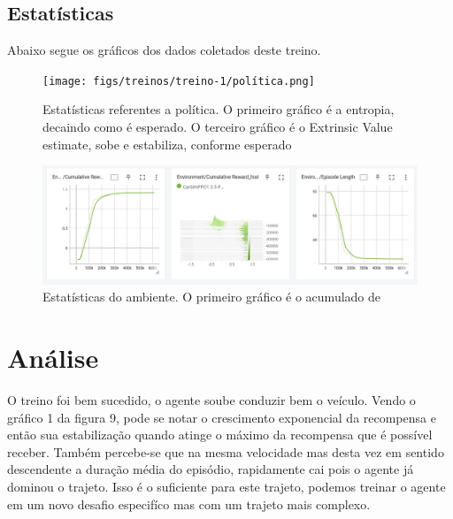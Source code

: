 \subsection*{Estatísticas}

Abaixo segue os gráficos dos dados coletados deste treino. 

\begin{figure}[h]
    \centering
    \texttt{[image: figs/treinos/treino-1/política.png]}
     \caption{Estatísticas referentes a política. O primeiro gráfico é a entropia, decaindo como é esperado. O terceiro gráfico é o Extrinsic Value estimate, sobe e estabiliza, conforme esperado}
     \label{fig:treino-1-politica}
\end{figure}

\begin{figure}[h]
    \centering
    \includegraphics[scale=0.35]{figs/treinos/treino-1/ambiente.png}
     \caption{Estatísticas do ambiente. O primeiro gráfico é o acumulado de }
     \label{fig:treino-1-ambiente}
\end{figure}

\section{Análise}
O treino foi bem sucedido, o agente soube conduzir bem o veículo. Vendo o gráfico 1 da figura 9, pode se notar o crescimento exponencial da recompensa e então sua estabilização quando atinge o máximo da recompensa que é possível receber. Também percebe-se que na mesma velocidade mas desta vez em sentido descendente a duração média do episódio, rapidamente cai pois o agente já dominou o trajeto. Isso é o suficiente para este trajeto, podemos treinar o agente em um novo desafio especifíco mas com um trajeto mais complexo.
